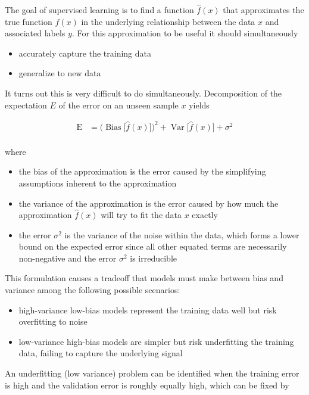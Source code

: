 The goal of supervised learning is to find a function $\hat{f}(x)$ that approximates the true function $f(x)$ in the underlying relationship between the data $x$ and associated labels $y$. For this approximation to be useful it should simultaneously

\begin{itemize}
    \item accurately capture the training data
    \item generalize to new data
\end{itemize}

It turns out this is very difficult to do simultaneously. Decomposition of the expectation $E$ of the error on an unseen sample $x$ yields

$$
{\displaystyle {\begin{aligned}\operatorname {E} &={\Big (}\operatorname {Bias} {\big [}{\hat {f}}(x){\big ]}{\Big )}^{2}+\operatorname {Var} {\big [}{\hat {f}}(x){\big ]}+\sigma ^{2}\\\end{aligned}}}
$$

where

\begin{itemize}
    \item the bias of the approximation is the error caused by the simplifying assumptions inherent to the approximation
    \item the variance of the approximation is the error caused by how much the approximation $\hat{f}(x)$ will try to fit the data $x$ exactly
    \item the error $\sigma^2$ is the variance of the noise within the data, which forms a lower bound on the expected error since all other equated terms are necessarily non-negative and the error $\sigma^2$ is irreducible
\end{itemize}

This formulation causes a tradeoff that models must make between bias and variance among the following possible scenarios:

\begin{itemize}
    \item high-variance low-bias models represent the training data well but risk overfitting to noise
    \item low-variance high-bias models are simpler but risk underfitting the training data, failing to capture the underlying signal
\end{itemize}

An underfitting (low variance) problem can be identified when the training error is high and the validation error is roughly equally high, which can be fixed by

